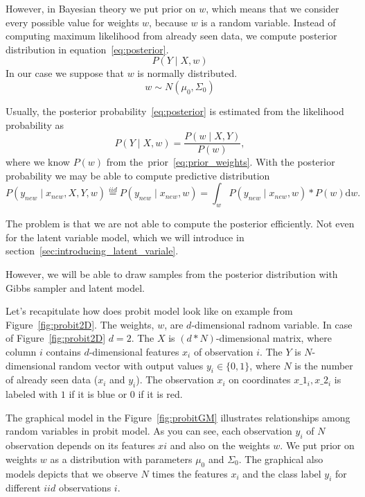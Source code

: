 However, in Bayesian theory we put prior on $w$, which means that we consider every possible value for weights $w$, because $w$ is a random variable. Instead of computing maximum likelihood from already seen data, we compute posterior distribution in equation~\ref{eq:posterior}.
\begin{equation}\label{eq:posterior}
    P(Y \mid X, w) 
\end{equation}
In our case we suppose that $w$ is normally distributed.
\begin{equation}\label{eq:prior_weights}
w \sim N(\mu_0, \Sigma_0)
\end{equation}

Usually, the posterior probability~\ref{eq:posterior} is estimated from the likelihood probability as
\begin{equation}
    P(Y \mid X, w) = \frac{P(w \mid X,Y)}{P(w)},
\end{equation}
where we know $P(w)$ from the~prior~\ref{eq:prior_weights}.
With the posterior probability we may be able to compute predictive distribution 
\begin{equation}
P(y_{new} \mid x_{new},X, Y, w) \overset{iid}{=} P(y_{new} \mid x_{new}, w) = \int_w P(y_{new} \mid x_{new}, w) * P(w) \mathrm{d} w.
\end{equation}

The problem is that we are not able to compute the posterior efficiently. Not even for the latent variable model, which we will introduce in section~\ref{sec:introducing_latent_variale}.

However, we will be able to draw samples from the posterior distribution with Gibbs sampler and latent model.

Let's recapitulate how does probit model look like on example from Figure~\ref{fig:probit2D}.
The weights, $w$, are $d$-dimensional radnom variable. In case of Figure~\ref{fig:probit2D} $d=2$.
The $X$ is $(d*N)$-dimensional matrix, where column $i$ contains $d$-dimensional features $x_i$ of observation $i$.
The $Y$ is $N$-dimensional random vector with output values $y_i \in \{0,1\}$, where $N$ is the number of already seen data ($x_i$ and $y_i$).
The observation $x_i$ on coordinates $x\_1_i,x\_2_i$ is labeled with $1$ if it is blue or $0$ if it is red.

The graphical model in the Figure~\ref{fig:probitGM} illustrates relationships among random variables in probit model. As you can see, each observation $y_i$ of $N$ observation depends on its features $xi$ and also on the weights $w$. We put prior on weights $w$ as a distribution with parameters $\mu_0$ and $\Sigma_0$. The graphical also models depicts that we observe $N$ times the features $x_i$ and the class label $y_i$ for different $iid$ observations $i$.

